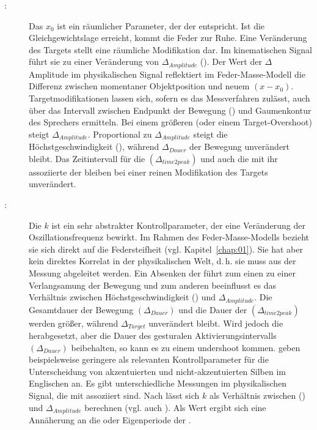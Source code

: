 \begin{description}
	\item[:] Das  ${x}_{0}$ ist ein räumlicher Parameter, der der  entspricht. Ist die Gleichgewichtslage erreicht, kommt die Feder zur Ruhe. Eine Veränderung des Targets stellt eine räumliche Modifikation dar. Im kinematischen Signal führt sie zu einer Veränderung von  ${\Delta} _{{Amplitude}}$ (). Der Wert der ${\Delta}$ Amplitude im physikalischen Signal reflektiert im Feder-Masse-Modell die Differenz zwischen momentaner Objektposition und neuem   $(x-x_{0})$. Targetmodifikationen lassen sich, sofern es das Messverfahren zulässt, auch über das Intervall zwischen Endpunkt der Bewegung () und Gaumenkontur des Sprechers ermitteln. Bei einem größeren  (oder einem Target-Overshoot) steigt  ${\Delta} _{{Amplitude}}$. Proportional zu  ${\Delta} _{{Amplitude}}$ steigt die Höchstgeschwindigkeit (), während  ${\Delta} _{{Dauer}}$ der Bewegung unverändert bleibt. Das Zeitintervall für die   $(\Delta_{{time2peak}})$ und auch die mit ihr assoziierte  der  bleiben bei einer reinen Modifikation des Targets unverändert.
\end{description}

\begin{description}
	\item[:] Die  $k$ ist ein sehr abstrakter Kontrollparameter, der eine Veränderung der Oszillationsfrequenz bewirkt. Im Rahmen des Feder-Masse-Modells bezieht sie sich direkt auf die Federsteifheit (vgl. Kapitel~\ref{chap:01}). Sie hat aber kein direktes Korrelat in der physikalischen Welt, d.\,h. sie muss aus der Messung abgeleitet werden. Ein Absenken der  führt zum einen zu einer Verlangsamung der Bewegung und zum anderen beeinflusst es das Verhältnis zwischen Höchstgeschwindigkeit () und  ${\Delta} _{{Amplitude}}$. Die Gesamtdauer der Bewegung  $\left({\Delta} _{{Dauer}}\right)$ und die Dauer der   $\left({\Delta} _{{time}2{peak}}\right)$ werden größer, während  ${\Delta} _{{Target}}$ unverändert bleibt. Wird jedoch die  herabgesetzt, aber die Dauer des gesturalen Aktivierungsintervalls  $\left({\Delta} _{{Dauer}}\right)$ beibehalten, so kann es zu einem  undershoot kommen. \citet{Beckman1992} geben beispielsweise geringere  als relevanten Kontrollparameter für die Unterscheidung von akzentuierten und nicht-akzentuierten Silben im Englischen an. Es gibt unterschiedliche Messungen im physikalischen Signal, die mit  assoziiert sind. Nach \citet{Munhall1985} lässt sich  $k$ als Verhältnis zwischen  () und  ${\Delta} _{{Amplitude}}$ berechnen (vgl. auch \citealt{Hawkins1992, Beckman1992, Roon2007}). Als Wert ergibt sich eine Annäherung an die  oder Eigenperiode der .
\end{description}

